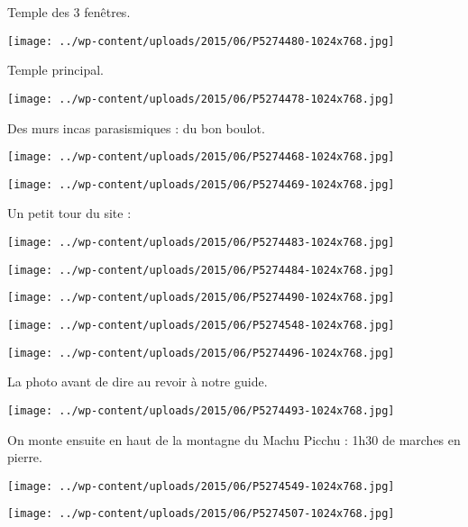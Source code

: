 Temple des 3 fenêtres. 
\begin{center} \texttt{[image: ../wp-content/uploads/2015/06/P5274480-1024x768.jpg]} \end{center}

Temple principal. 
\begin{center} \texttt{[image: ../wp-content/uploads/2015/06/P5274478-1024x768.jpg]} \end{center}
\pagebreak

Des murs incas parasismiques : du bon boulot. 
\begin{center} \texttt{[image: ../wp-content/uploads/2015/06/P5274468-1024x768.jpg]} \end{center}
\begin{center} \texttt{[image: ../wp-content/uploads/2015/06/P5274469-1024x768.jpg]} \end{center}
\pagebreak

Un petit tour du site : 
\begin{center} \texttt{[image: ../wp-content/uploads/2015/06/P5274483-1024x768.jpg]} \end{center}
\begin{center} \texttt{[image: ../wp-content/uploads/2015/06/P5274484-1024x768.jpg]} \end{center}

\begin{center} \texttt{[image: ../wp-content/uploads/2015/06/P5274490-1024x768.jpg]} \end{center}
\begin{center} \texttt{[image: ../wp-content/uploads/2015/06/P5274548-1024x768.jpg]} \end{center}

\begin{center} \texttt{[image: ../wp-content/uploads/2015/06/P5274496-1024x768.jpg]} \end{center}

La photo avant de dire au revoir à notre guide. 
\begin{center} \texttt{[image: ../wp-content/uploads/2015/06/P5274493-1024x768.jpg]} \end{center}
\pagebreak

On monte ensuite en haut de la montagne du Machu Picchu : 1h30 de marches en pierre. 
\begin{center} \texttt{[image: ../wp-content/uploads/2015/06/P5274549-1024x768.jpg]} \end{center}
\begin{center} \texttt{[image: ../wp-content/uploads/2015/06/P5274507-1024x768.jpg]} \end{center}
\pagebreak

